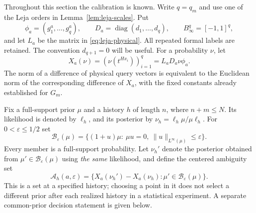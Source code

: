 \documentclass[11pt]{amsart}
\theoremstyle{definition}\newtheorem{definition}[theorem]{Definition}
\theoremstyle{remark}\newtheorem{remark}[theorem]{Remark}
\begin{document}
Throughout this section the calibration is known. Write $q=q_m$ and use
one of the Leja orders in Lemma~\ref{lem:leja-scales}. Put
\[
 \phi_a=(g_1^a,\ldots,g_q^a),\qquad
 D_a=\operatorname{diag}(d_1,\ldots,d_q),\qquad
 B_\infty^q=[-1,1]^q,
\]
and let $L_a$ be the matrix in \eqref{eq:leja-physical}. All repeated
formal labels are retained. The convention $d_{q+1}=0$ will be useful.
For a probability $\nu$, let
\[
 X_a(\nu)=(\nu(t^{Hx_i}))_{i=1}^q=L_aD_a\nu\phi_a.
\]
The norm of a difference of physical query vectors is equivalent to the
Euclidean norm of the corresponding difference of $X_a$, with the fixed
constants already established for $G_m$.

Fix a full-support prior $\mu$ and a history $h$ of length $n$, where
$n+m\le N$. Its likelihood is denoted by $\ell_h$, and its posterior
by $\nu_h=\ell_h\mu/\mu\ell_h$. For $0<\varepsilon\le1/2$ set
\begin{equation}\label{eq:relative-prior-ball}
 \mathcal B_\varepsilon(\mu)=
 \{(1+u)\mu:\ \mu u=0,\ \|u\|_{L^\infty(\mu)}\le\varepsilon\}.
\end{equation}
Every member is a full-support probability. Let $\nu_h'$ denote the
posterior obtained from $\mu'\in\mathcal B_\varepsilon(\mu)$ using
\emph{the same} likelihood, and define the centered ambiguity set
\begin{equation}\label{eq:ambiguity-body}
 \mathcal A_h(a,\varepsilon)=
 \{X_a(\nu_h')-X_a(\nu_h):\mu'\in\mathcal B_\varepsilon(\mu)\}.
\end{equation}
This is a set at a specified history; choosing a point in it does not
select a different prior after each realized history in a statistical
experiment. A separate common-prior decision statement is given below.
\end{document}
